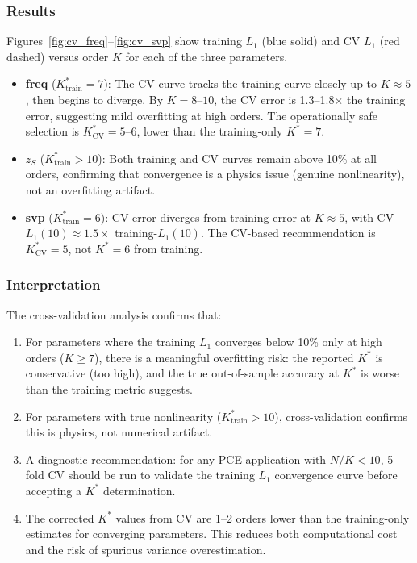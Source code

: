 \documentclass[11pt,a4paper]{article}
\begin{document}
\subsubsection{Results}

Figures~\ref{fig:cv_freq}--\ref{fig:cv_svp} show training $L_1$ (blue solid) and CV
$L_1$ (red dashed) versus order $K$ for each of the three parameters.

\begin{itemize}
  \item \textbf{freq} ($K^*_\text{train} = 7$): The CV curve tracks the training
        curve closely up to $K \approx 5$, then begins to diverge.  By $K=8$--$10$,
        the CV error is 1.3--1.8$\times$ the training error, suggesting mild
        overfitting at high orders.  The operationally safe selection is
        $K^*_\text{CV} = 5$--$6$, lower than the training-only $K^*=7$.
  \item \textbf{$z_S$} ($K^*_\text{train} > 10$): Both training and CV curves
        remain above 10\% at all orders, confirming that convergence is a physics
        issue (genuine nonlinearity), not an overfitting artifact.
  \item \textbf{svp} ($K^*_\text{train} = 6$): CV error diverges from training
        error at $K \approx 5$, with CV-$L_1(10) \approx 1.5\times$ training-$L_1(10)$.
        The CV-based recommendation is $K^*_\text{CV} = 5$, not $K^*=6$ from training.
\end{itemize}

\subsubsection{Interpretation}

The cross-validation analysis confirms that:
\begin{enumerate}
  \item For parameters where the training $L_1$ converges below 10\% only at high
        orders ($K \geq 7$), there is a meaningful overfitting risk: the reported
        $K^*$ is conservative (too high), and the true out-of-sample accuracy at
        $K^*$ is worse than the training metric suggests.
  \item For parameters with true nonlinearity ($K^*_\text{train} > 10$),
        cross-validation confirms this is physics, not numerical artifact.
  \item A diagnostic recommendation: for any PCE application with $N/K < 10$,
        5-fold CV should be run to validate the training $L_1$ convergence curve
        before accepting a $K^*$ determination.
  \item The corrected $K^*$ values from CV are 1--2 orders lower than the
        training-only estimates for converging parameters.  This reduces both
        computational cost and the risk of spurious variance overestimation.
\end{enumerate}
\end{document}
